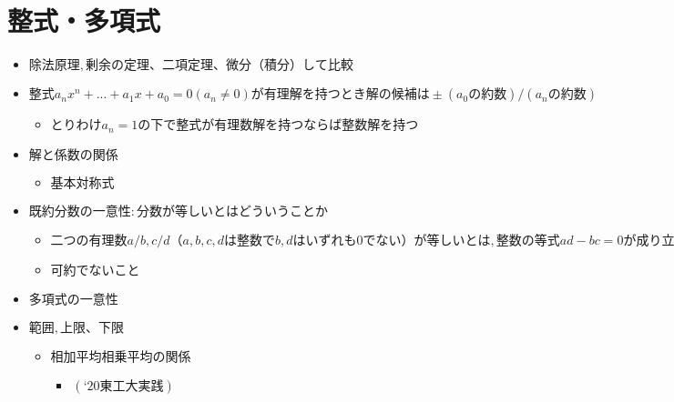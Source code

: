 \documentclass[dvipdfmx,uplatex]{jsarticle}
\begin{document}
\section{整式・多項式}
\begin{itemize}
	\item $ 除法原理,剰余の定理、二項定理、微分（積分）して比較$
	\item $ 整式a_nx^n+...+a_1x+a_0=0(a_n≠0)が有理解を持つとき解の候補は±(a_0の約数)/(a_nの約数)$
	\begin{itemize}
		\item $ とりわけa_n=1の下で整式が有理数解を持つならば整数解を持つ$
	\end{itemize}
	\item $ 解と係数の関係$
	\begin{itemize}
		\item $ 基本対称式$
	\end{itemize}
	\item $ 既約分数の一意性:分数が等しいとはどういうことか$
	\begin{itemize}
		\item $ 二つの有理数 a/b, c/d（a, b, c, d は整数で b, d はいずれも 0 でない）が等しいとは,整数の等式ad - bc = 0が成り立つことを言う$
		\item $ 可約でないこと$
	\end{itemize}
	\item $ 多項式の一意性$
	\item $ 範囲,上限、下限$
	\begin{itemize}
		\item $ 相加平均相乗平均の関係$
		\begin{itemize}
			\item $ (‘20東工大実践)$
		\end{itemize}
	\end{itemize}
\end{itemize}
\end{document}
